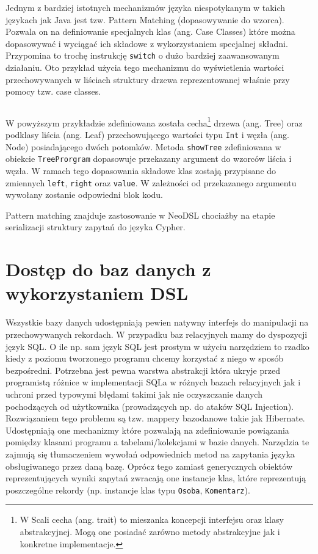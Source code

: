\documentclass[brudnopis]{xmgr}
\begin{document}
Jednym z bardziej istotnych mechanizmów języka niespotykanym w takich językach jak Java jest tzw. Pattern Matching (dopasowywanie do wzorca). Pozwala on na definiowanie specjalnych klas (ang. Case Classes) które można dopasowywać i wyciągać ich składowe z wykorzystaniem specjalnej składni. Przypomina to trochę instrukcję \texttt{switch} o dużo bardziej zaawansowanym działaniu. Oto przykład użycia tego mechanizmu do wyświetlenia wartości przechowywanych w liściach struktury drzewa reprezentowanej właśnie przy pomocy tzw. case classes.

\inputminted{scala}{listings/scala/pattern-matching-trees.scala}

W powyższym przykładzie zdefiniowana została cecha\footnote{W Scali cecha (ang. trait) to mieszanka koncepcji interfejsu oraz klasy abstrakcyjnej. Mogą one posiadać zarówno metody abstrakcyjne jak i konkretne implementacje.} drzewa (ang. Tree) oraz podklasy liścia (ang. Leaf) przechowującego wartości typu \texttt{Int} i węzła (ang. Node) posiadającego dwóch potomków. Metoda \texttt{showTree} zdefiniowana w obiekcie \texttt{TreeProrgram} dopasowuje przekazany argument do wzorców liścia i węzła. W ramach tego dopasowania składowe klas zostają przypisane do zmiennych \texttt{left}, \texttt{right} oraz \texttt{value}. W zależności od przekazanego argumentu wywołany zostanie odpowiedni blok kodu.

Pattern matching znajduje zastosowanie w NeoDSL chociażby na etapie serializacji struktury zapytań do języka Cypher.

\chapter{Dostęp do baz danych z wykorzystaniem DSL}

Wszystkie bazy danych udostępniają pewien natywny interfejs do manipulacji na przechowywanych rekordach. W przypadku baz relacyjnych mamy do dyspozycji język SQL. O ile np. sam język SQL jest prostym w użyciu narzędziem to rzadko kiedy z poziomu tworzonego programu chcemy korzystać z niego w sposób bezpośredni. Potrzebna jest pewna warstwa abstrakcji która ukryje przed programistą różnice w implementacji SQLa w różnych bazach relacyjnych jak i uchroni przed typowymi błędami takimi jak nie oczyszczanie danych pochodzących od użytkownika (prowadzących np. do ataków SQL Injection). Rozwiązaniem tego problemu są tzw. mappery bazodanowe takie jak Hibernate. Udostępniają one mechanizmy które pozwalają na zdefiniowanie powiązania pomiędzy klasami programu a tabelami/kolekcjami w bazie danych. Narzędzia te zajmują się tłumaczeniem wywołań odpowiednich metod na zapytania języka obsługiwanego przez daną bazę. Oprócz tego zamiast generycznych obiektów reprezentujących wyniki zapytań zwracają one instancje klas, które reprezentują poszczególne rekordy (np. instancje klas typu \texttt{Osoba}, \texttt{Komentarz}).
\end{document}
